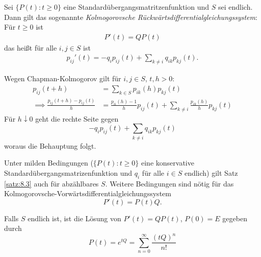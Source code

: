 \documentclass[a4paper,twoside,DIV15,BCOR12mm]{scrbook}
\begin{document}
\begin{satz}
\label{satz:8.3}
Sei $\{P(t) : t\ge 0\}$ eine Standardübergangsmatritzenfunktion und $S$ sei endlich. Dann gilt das sogenannte \emph{Kolmogorovsche Rückwärtsdifferentialgleichungssystem}: Für $t\ge 0$ ist
\begin{align*}
P'(t) = QP(t)
\end{align*}
das heißt für alle $i,j\in S$ ist
\begin{align*}
p_{ij}'(t) = -q_i p_{ij}(t) + \sum_{k\ne i} q_{ik}p_{kj}(t).
\end{align*}
\end{satz}

\begin{beweis}
Wegen Chapman-Kolmogorov gilt für $i,j\in S$, $t,h>0$:
\begin{align*}
p_{ij}(t+h) &= \sum_{k\in S} p_{ik}(h) p_{kj}(t) \\
\implies \frac{p_{ij}(t+h) - p_{ij}(t)}h &=
\frac{p_{ii}(h) - 1}h p_{ij}(t) + \sum_{k\ne i} \frac{p_{ik}(h)}h p_{kj}(t) 
\end{align*}
Für $h\downarrow0$ geht die rechte Seite gegen
\[
-q_i p_{ij}(t) + \sum_{k\ne i}q_{ik}p_{kj}(t)
\]
woraus die Behauptung folgt.
\end{beweis}

\begin{bemerkung}
\begin{enuma}
\item Unter milden Bedingungen ($\{P(t): t\ge 0\}$ eine konservative Standardübergangsmatrizenfunktion und $q_i$ für alle $i\in S$ endlich) gilt Satz \ref{satz:8.3} auch für abzählbares $S$. Weitere Bedingungen sind nötig für das Kolmogorovsche-Vorwärtsdifferentialgleichungssystem
\[
P'(t) = P(t)Q.
\]
\item Falls $S$ endlich ist, ist die Lösung von $P'(t) =QP(t)$, $P(0)=E$ gegeben durch
\[
P(t) =e^{tQ} = \sum_{n=0}^\infty \frac{(tQ)^n}{n!}
\]
\end{enuma}

\end{bemerkung}
\end{document}
